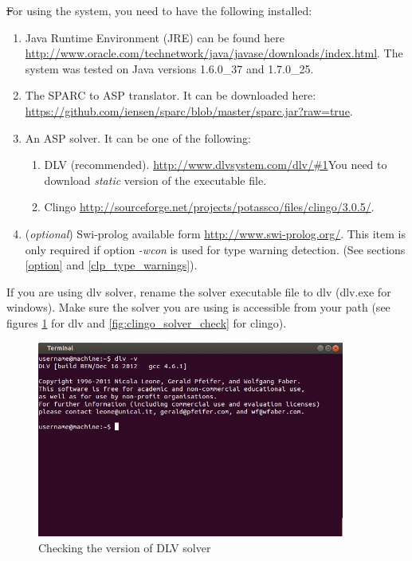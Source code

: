 \documentclass[12pt, letterpaper]{article}
\begin{document}
\st For using the system, you need to have the following installed:
\begin{enumerate}
\item Java Runtime Environment (JRE) can be found here \url{http://www.oracle.com/technetwork/java/javase/downloads/index.html}.
The system was tested on Java versions 1.6.0\_37 and 1.7.0\_25.
\item The SPARC to ASP translator. It can be downloaded here: \url{https://github.com/iensen/sparc/blob/master/sparc.jar?raw=true}.
\item An ASP solver. It can be one of the following:
\begin{enumerate} 
\item DLV (recommended).
 \url{http://www.dlvsystem.com/dlv/#1}You need to download \textit{static} version of the executable file.
\item Clingo \url{http://sourceforge.net/projects/potassco/files/clingo/3.0.5/}.
\end{enumerate}

\item (\textit{optional}) Swi-prolog available form \url{http://www.swi-prolog.org/}. This item is only required if option \textit{-wcon} is used for type warning detection.
(See sections \ref{option} and \ref{clp_type_warnings}).

\end{enumerate}
If you are using dlv solver, rename the solver executable file to dlv (dlv.exe for windows).
Make sure the solver you are using is accessible from your path (see figures \ref{fig:dlv_solver_check} for dlv and \ref{fig:clingo_solver_check} for clingo).

\begin{figure}[p]
\centering
\includegraphics[width=0.9\textwidth]{dlv_version.jpg}
\caption{Checking the version of DLV solver}
\label{fig:dlv_solver_check}
\end{figure}
\end{document}
